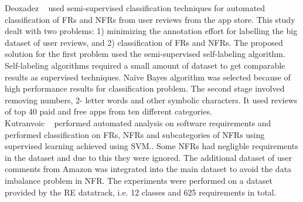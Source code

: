 Deoxadez \etal~\cite{Deocadez:2017} used semi-supervised classification
techniques for automated classification of FRs and NFRs from user reviews from
the app store. This study dealt with two problems: 1) minimizing the annotation
effort for labelling the big dataset of user reviews, and 2) classification of
FRs and NFRs. The proposed solution for the first problem used
the semi-supervised self-labeling algorithm. Self-labeling algorithms required a
small amount of dataset to get comparable results as supervised techniques. Naïve Bayes
algorithm was selected because of high performance results for classification
problem.  The second stage involved removing numbers, 2-
letter words and other symbolic characters. It used reviews of top 40 paid and free apps from ten
different categories.\\

Kutranvoic \etal ~ \cite {Kurtanovic:2017} performed automated analysis on
software requirements and performed classification on FRs,
NFRs and subcategories of NFRs using supervised learning achieved using
SVM.. Some NFRs had negligble
requirements in the dataset and due to this
they were ignored. The additional dataset of user comments
from Amazon was integrated into the main dataset to avoid the data imbalance
problem in NFR.  The experiments were performed on a dataset provided by the RE
datatrack, i.e. 12 classes and 625 requirements in total.\\

